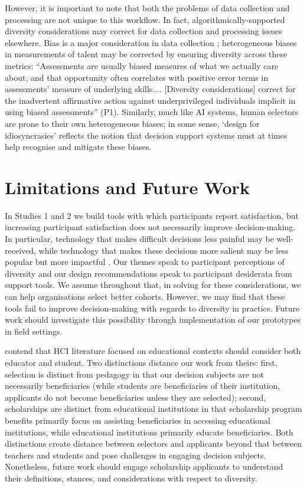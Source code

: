 However, it is important to note that both the problems of data collection and processing are not unique to this workflow. In fact, algorithmically-supported diversity considerations may correct for data collection and processing issues elsewhere. Bias is a major consideration in data collection \cite{Friedler_Scheidegger_Venkatasubramanian_2016}; heterogeneous biases in measurements of talent may be corrected by ensuring diversity across these metrics: ``Assessments are usually biased measures of what we actually care about, and that opportunity often correlates with positive error terms in assessments' measure of underlying skills.... [Diversity considerations] correct for the inadvertent affirmative action against underprivileged individuals implicit in using biased assessments'' (P1). Similarly, much like AI systems, human selectors are prone to their own heterogeneous biases; in some sense, `design for idiosyncrasies' reflects the notion that decision support systems must at times help recognise and mitigate these biases.

\section{Limitations and Future Work}
In Studies 1 and 2 we build tools with which participants report satisfaction, but increasing participant satisfaction does not necessarily improve decision-making. In particular, technology that makes difficult decisions less painful may be well-received, while technology that makes these decisions more salient may be less popular but more impactful \cite{Lipton,miller_explainable_2023}. Our themes speak to participant perceptions of diversity and our design recommendations speak to participant desiderata from support tools. We assume throughout that, in solving for these considerations, we can help organisations select better cohorts. However, we may find that these tools fail to improve decision-making with regards to diversity in practice. Future work should investigate this possibility through implementation of our prototypes in field settings.

\textcite{venn-wycherley_realities_2024} contend that HCI literature focused on educational contexts should consider both educator and student. Two distinctions distance our work from theirs: first, selection is distinct from pedagogy in that our decision subjects are not necessarily beneficiaries (while students are beneficiaries of their institution, applicants do not become beneficiaries unless they are selected); second, scholarships are distinct from educational institutions in that scholarship program benefits primarily focus on assisting beneficiaries in accessing educational institutions, while educational institutions primarily educate beneficiaries. Both distinctions create distance between selectors and applicants beyond that between teachers and students and pose challenges in engaging decision subjects. Nonetheless, future work should engage scholarship applicants to understand their definitions, stances, and considerations with respect to diversity. 

